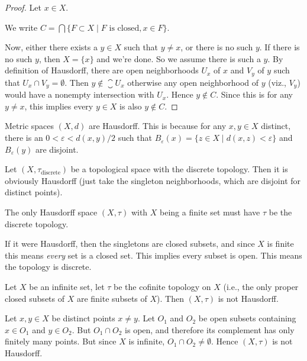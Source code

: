 \begin{proof}
Let $x\in X$.

We write $C=\bigcap\{F\subset X\mid F\mbox{ is closed}, x\in F\}$.

Now, either there exists a $y\in X$ such that $y\neq x$, or there is no
such $y$. If there is no such $y$, then $X=\{x\}$ and we're done.
So we assume there is such a $y$. By definition of Hausdorff, there
are open neighborhoods $U_{x}$ of $x$ and $V_{y}$ of $y$ such that
$U_{x}\cap V_{y}=\emptyset$. Then $y\notin\closure{U_{x}}$ otherwise
any open neighborhood of $y$ (viz., $V_{y}$) would have a nonempty
intersection with $U_{x}$. Hence $y\notin C$. Since this is for any
$y\neq x$, this implies every $y\in X$ is also $y\notin C$.
\end{proof}

\begin{example}
Metric spaces $(X,d)$ are Hausdorff. This is because for any $x,y\in X$
distinct, there is an $0<\varepsilon<d(x,y)/2$ such that
$B_{\varepsilon}(x)=\{z\in X\mid d(x,z)<\varepsilon\}$ and $B_{\varepsilon}(y)$
are disjoint.
\end{example}

\begin{example}
Let $(X,\tau_{\text{discrete}})$ be a topological space with the
discrete topology. Then it is obviously Hausdorff (just take the
singleton neighborhoods, which are disjoint for distinct points).
\end{example}

\begin{example}
The only Hausdorff space $(X,\tau)$ with $X$ being a finite set must
have $\tau$ be the discrete topology.

If it were Hausdorff, then the singletons are closed subsets, and
since $X$ is finite this means \emph{every} set is a closed set. This
implies every subset is open. This means the topology is discrete.
\end{example}

\begin{example}
Let $X$ be an infinite set, let $\tau$ be the cofinite topology on $X$
(i.e., the only proper closed subsets of $X$ are finite subsets of $X$).
Then $(X,\tau)$ is not Hausdorff.

Let $x,y\in X$ be distinct points $x\neq y$. Let $O_{1}$ and $O_{2}$
be open subsets containing $x\in O_{1}$ and $y\in O_{2}$. But
$O_{1}\cap O_{2}$ is open, and therefore its complement has only
finitely many points. But since $X$ is infinite, $O_{1}\cap O_{2}\neq\emptyset$.
Hence $(X,\tau)$ is not Hausdorff.
\end{example}


